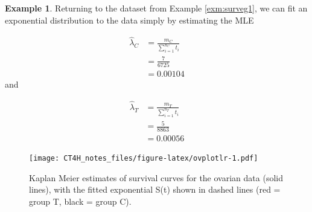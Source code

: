 \documentclass[
  openany]{book}
\newenvironment{Shaded}{\begin{snugshade}}{\end{snugshade}}
\newcommand{\DecValTok}[1]{\textcolor[rgb]{0.00,0.00,0.81}{#1}}
\newcommand{\FunctionTok}[1]{\textcolor[rgb]{0.13,0.29,0.53}{\textbf{#1}}}
\newcommand{\NormalTok}[1]{#1}
\newcommand{\OtherTok}[1]{\textcolor[rgb]{0.56,0.35,0.01}{#1}}
\newcommand{\SpecialCharTok}[1]{\textcolor[rgb]{0.81,0.36,0.00}{\textbf{#1}}}
\theoremstyle{definition}
\theoremstyle{definition}
\newtheorem{example}{Example}[chapter]
\theoremstyle{definition}
\theoremstyle{definition}
\theoremstyle{remark}
\begin{document}
\begin{example}

Returning to the dataset from Example \ref{exm:surveg1}, we can fit an exponential distribution to the data simply by estimating the MLE

\[ 
\begin{aligned}
\hat{\lambda}_C &= \frac{m_C}{\sum\limits_{i=1}^{n_C} t_i}\\
& =\frac{7}{6725}\\
& = 0.00104
\end{aligned}
\]
and

\[ 
\begin{aligned}
\hat{\lambda}_T &= \frac{m_T}{\sum\limits_{i=1}^{n_T} t_i}\\
& =\frac{5}{8863}\\
& = 0.00056
\end{aligned}
\]

\begin{Shaded}
\end{Shaded}

\begin{figure}
\centering
\texttt{[image: CT4H\_notes\_files/figure-latex/ovplotlr-1.pdf]}
\caption{\label{fig:ovplotlr}Kaplan Meier estimates of survival curves for the ovarian data (solid lines), with the fitted exponential S(t) shown in dashed lines (red = group T, black = group C).}
\end{figure}


\end{example}
\end{document}
